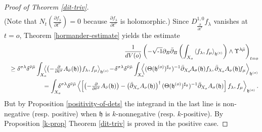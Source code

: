 \documentclass[12pt,hidelinks]{amsart}
\newcommand{\fh}{{\mathfrak h}}
\newcommand{\di}{\partial}
\newcommand{\dbar}{\bar \partial}
\newcommand{\ii}{\sqrt{\text{\rm -}1}}
\begin{document}
\begin{proof}[Proof of Theorem \ref{dit-triv}]
\begin{eqnarray*}
\end{eqnarray*}
(Note that $N_t(\frac{\di f_{\lambda}}{\di t  ^{\sigma}}) = 0$ because $\frac{\di f_{\lambda}}{\di t  ^{\sigma}}$ is holomorphic.) 
Since $D^{1,0} _{\frac{\di}{\di t  ^{\sigma}}} f_{\lambda}$ vanishes at $t=o$, Theorem \ref{hormander-estimate} yields the estimate
\begin{eqnarray*}
&& \frac{1}{dV(o)} \left ( - \ii \di _{B}\dbar _{B} \left ( \int _{X_o}\left < f_{\lambda} , f_{\mu} \right >_{\fh^{(t)}} \right ) \wedge \Upsilon ^{\lambda \bar \mu} \right )_{t =o} \\
&& \ge \delta ^{\sigma \lambda} \delta ^{\bar \nu \bar \mu}  \int _{X_o} \!\!\!\! \left <\left (-\tfrac{\di}{\di t ^{\sigma}} A_{\bar \nu} (\fh) \right ) \! f_{\lambda} ,f_{\mu} \right >_{\fh^{(o)}}  \! - \! \delta ^{\sigma \lambda} \delta ^{\bar \nu \bar \mu}  \int _{X_o}\!\!\!\!  \left < (\Theta (\fh^{(o)})^{\sharp_g}) ^{-1} \dbar _{X_o} \!  A_{\sigma} (\fh) f_{\lambda}, \dbar _{X_o} A_{\nu} (\fh)\! f_{\mu} \right >_{\fh^{(o)}}\\
&&  =\int _{X_o} \!\!\!\! \delta ^{\sigma \lambda} \delta ^{\bar \nu \bar \mu} \left <\left [ \left (-\tfrac{\di}{\di t ^{\sigma}} A_{\bar \nu} (\fh) \right ) - \left (  \dbar _{X_o} A_{\nu} (\fh) \right ) ^{\dagger} (\Theta (\fh^{(o)})^{\sharp _g})^{-1} \dbar _{X_o}  A_{\sigma} (\fh)\right ]  f_{\lambda}, f_{\mu} \right >_{\fh^{(o)}} .
\end{eqnarray*}
But by Proposition \ref{positivity-of-dets} the integrand in the last line is non-negative (resp. positive) when $\fh$ is $k$-nonnegative (resp. $k$-positive).  By Proposition \ref{k-prop} Theorem \ref{dit-triv} is proved in the positive case.

\medskip 


\end{proof}
\end{document}
